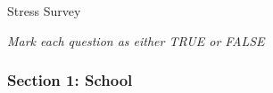 \documentclass[letterpaper, 12pt]{article}
\begin{document}
	

	
\begin{center} Stress Survey
\end{center}


		
 \textit{Mark each question as either TRUE or FALSE}
 \vspace{-.15in}
 \subsubsection*{Section 1: School}
\end{document}
